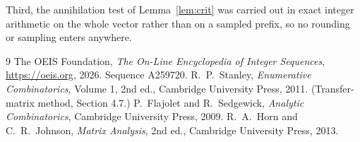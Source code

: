 \documentclass[11pt,a4paper]{article}
\theoremstyle{plain}
\theoremstyle{definition}
\begin{document}
Third, the annihilation test of Lemma~\ref{lem:crit} was carried out in exact integer
arithmetic on the whole vector rather than on a sampled prefix, so no rounding or sampling
enters anywhere.

\begin{thebibliography}{9}
 The OEIS Foundation, \emph{The On-Line Encyclopedia of Integer
Sequences}, \url{https://oeis.org}, 2026. Sequence A259720.
 R.~P.~Stanley, \emph{Enumerative Combinatorics}, Volume 1, 2nd ed.,
Cambridge University Press, 2011. (Transfer-matrix method, Section 4.7.)
 P.~Flajolet and R.~Sedgewick, \emph{Analytic Combinatorics}, Cambridge
University Press, 2009.
 R.~A.~Horn and C.~R.~Johnson, \emph{Matrix Analysis}, 2nd ed., Cambridge
University Press, 2013.
\end{thebibliography}
\end{document}
